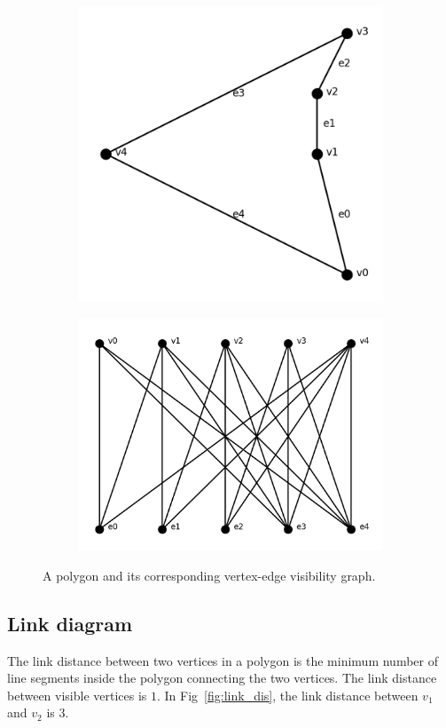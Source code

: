 \documentclass[]{styles/svproc}  %
\begin{document}
\begin{figure}
\centering
\begin{subfigure}{0.25\textwidth}
  \includegraphics[width=0.6\linewidth]{figures/concave_pent.png}
  \label{fig:c_p}
\end{subfigure}%
\begin{subfigure}{0.25\textwidth}
  \includegraphics[width=0.8\linewidth]{figures/viz_edge_graph.png}
\end{subfigure}
\caption{A polygon and its corresponding vertex-edge visibility graph.\label{fig:veg}}

\end{figure}




\subsection{Link diagram}

The link distance between two vertices in a polygon is the minimum number of line segments inside the polygon connecting the two vertices. The link distance between visible vertices is $1$. In Fig~\ref{fig:link_dis}, the link distance between $v_1$ and $v_2$ is 3.
\end{document}
